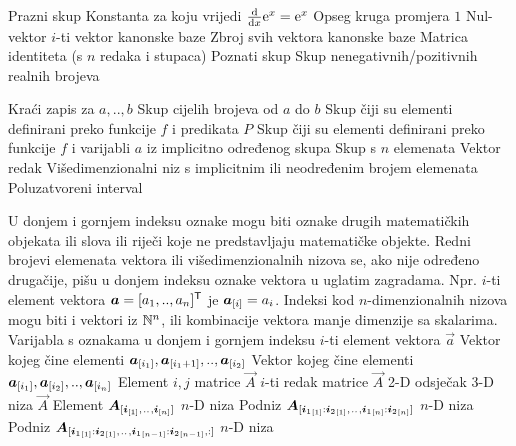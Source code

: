 	{Prazni skup}
	{Konstanta za koju vrijedi $\od{}{x}\const e^x=\const e^x$}
	{Opseg kruga promjera $1$}
	{Nul-vektor}
	{$i$-ti vektor kanonske baze}
	{Zbroj svih vektora kanonske baze}
	{Matrica identiteta (s $n$ redaka i stupaca)}
	{Poznati skup}
	{Skup nenegativnih/pozitivnih realnih brojeva}

	{Kraći zapis za $a,..,b$}
	{Skup cijelih brojeva od $a$ do $b$}
	{Skup čiji su elementi definirani preko funkcije $f$ i predikata $P$}
	{Skup čiji su elementi definirani preko funkcije $f$ i varijabli $a$ iz implicitno određenog skupa}
	{Skup s $n$ elemenata}
	{Vektor redak}
	{Višedimenzionalni niz s implicitnim ili neodređenim brojem elemenata}
	{Poluzatvoreni interval}

{U donjem i gornjem indeksu oznake mogu biti oznake drugih matematičkih objekata ili slova ili riječi koje ne predstavljaju matematičke objekte. Redni brojevi elemenata vektora ili višedimenzionalnih nizova se, ako nije određeno drugačije, pišu u donjem indeksu oznake vektora u uglatim zagradama. Npr. $i$-ti element vektora $\vec a=\sbr{a_1,.., a_n}^\tp$ je $\vec a_\ind{i}=a_i$. Indeksi kod $n$-dimenzionalnih nizova mogu biti i vektori iz $\mathbb{N}^{n}$, ili kombinacije vektora manje dimenzije sa skalarima.}
	{Varijabla s oznakama u donjem i gornjem indeksu}
	{$i$-ti element vektora $\vec{a}$}
	{Vektor kojeg čine elementi $\vec{a}_\ind{i_1}, \vec{a}_\ind{i_1+1},.., \vec{a}_{\sbr{i_2}}$}
	{Vektor kojeg čine elementi $\vec{a}_\ind{i_1}, \vec{a}_\ind{i_2},.., \vec{a}_{\sbr{i_n}}$}
	{Element $i,j$ matrice $\vec A$}
	{$i$-ti redak matrice $\vec A$}
	{2-D odsječak 3-D niza $\vec A$}
	{Element $\vec{A}_\ind{\vec i_\ind{1},\bidot,\vec i_\ind{n}}$ $n$-D niza}
	{Podniz $\vec{A}_\ind{{\vec i_1}_\ind{1}:{\vec i_2}_\ind{1},\bidot,{\vec i_1}_\ind{n}:{\vec i_2}_\ind{n}}$ $n$-D niza}
	{Podniz $\vec{A}_\ind{{\vec i_1}_\ind{1}:{\vec i_2}_\ind{1},\bidot,{\vec i_1}_\ind{n-1}:{\vec i_2}_\ind{n-1},:}$ $n$-D niza}

